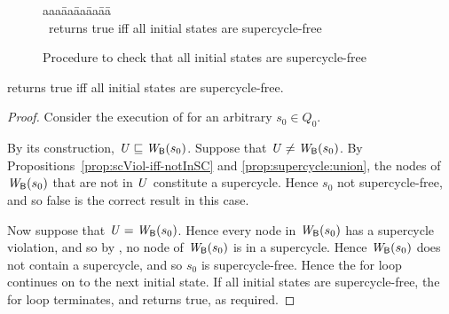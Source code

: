    \label{s:initSCFree}
%   


\begin{figure}[ht]
\setcounter{lctr}{0}
\begin{tabbing}\label{alg:compute-scViol}
aaa\= aa\= aa\= aa\= aa\=\kill
{}\\
\cmnt\ returns true iff all initial states are supercycle-free\\
\lio{\ENDFOR;}
\end{tabbing}
\caption{Procedure to check that all initial states are supercycle-free}
\label{fig:checkInitSCFree}
\end{figure}


\begin{proposition}
 returns true iff all initial states are supercycle-free.
\end{proposition}
%
\begin{proof}
Consider the execution of  for an arbitrary $s_0 \in Q_0$.

By its construction, $\mathit{U} \sqsubseteq \mathit{W}_{\mathsf{B}}({s_0})$.
Suppose that $\mathit{U} \ne  \mathit{W}_{\mathsf{B}}({s_0})$.
By Propositions~\ref{prop:scViol-iff-notInSC} and
\ref{prop:supercycle:union}, the nodes of $\mathit{W}_{\mathsf{B}}({s_0})$ that are not in $\mathit{U}$ constitute a supercycle.
Hence $s_0$ not supercycle-free, and so false is the correct result in this case.

Now suppose that $\mathit{U} = \mathit{W}_{\mathsf{B}}({s_0})$. Hence every node in $\mathit{W}_{\mathsf{B}}({s_0})$ has a supercycle violation, and so
by , no node of $\mathit{W}_{\mathsf{B}}({s_0})$ is in a 
supercycle. Hence  $\mathit{W}_{\mathsf{B}}({s_0})$ does not contain a supercycle, and so
$s_0$ is supercycle-free.
Hence the for loop continues on to the next initial state.
If all initial states are supercycle-free, the for loop terminates, and
 returns true, as required.
\end{proof}





